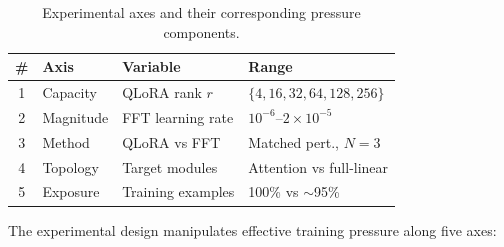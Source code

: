 \documentclass[a4paper,fleqn]{cas-dc}
\begin{document}
\begin{table}[htbp]
\caption{Experimental axes and their corresponding pressure
components.}\label{tab:axes}
\begin{tabular}{@{}clll@{}}
\toprule
\# & Axis & Variable & Range \\
\midrule
1 & Capacity & QLoRA rank $r$ & $\{4, 16, 32, 64, 128, 256\}$ \\
2 & Magnitude & FFT learning rate & $10^{-6}$--$2{\times}10^{-5}$ \\
3 & Method & QLoRA vs FFT & Matched pert., $N{=}3$ \\
4 & Topology & Target modules & Attention vs full-linear \\
5 & Exposure & Training examples & 100\% vs ${\sim}$95\% \\
\bottomrule
\end{tabular}
\end{table}

The experimental design manipulates effective training pressure along five axes:
\end{document}
